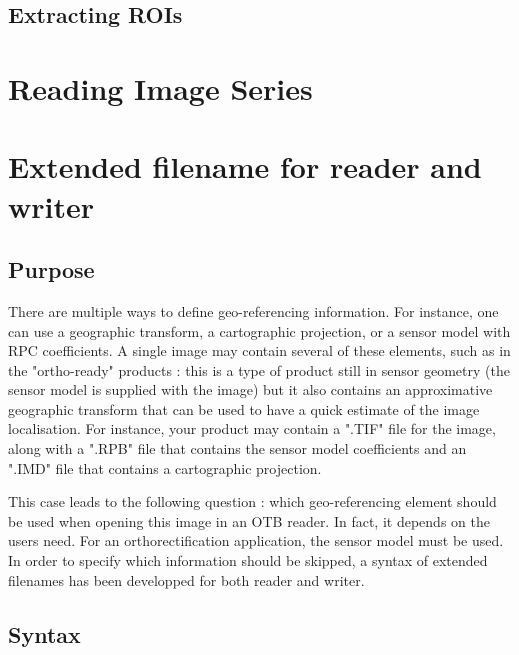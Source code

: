 \subsection{Extracting ROIs}
\label{sec:ExtractROI}



%

\section{Reading Image Series}
\label{sec:ReadingImageSeries}



\section{Extended filename for reader and writer}
\label{sec:ExtendedFilename}

\subsection{Purpose}

There are multiple ways to define geo-referencing information. For instance,
 one can use a geographic transform, a cartographic projection, or a sensor 
model with RPC coefficients. A single image may contain several of these 
elements, such as in the "ortho-ready" products : this is a type of product 
still in sensor geometry (the sensor model is supplied with the image) 
but it also contains an approximative geographic transform that can be used 
to have a quick estimate of the image localisation. For instance, your product
may contain a ".TIF" file for the image, along with a ".RPB" file that contains
the sensor model coefficients and an ".IMD" file that contains a cartographic 
projection. 

This case leads to the following question : which geo-referencing element
should be used when opening this image in an OTB reader. In fact, it depends on
the users need. For an orthorectification application, the sensor model must be
used. In order to specify which information should be skipped, a syntax of 
extended filenames has been developped for both reader and writer. 


\subsection{Syntax}

